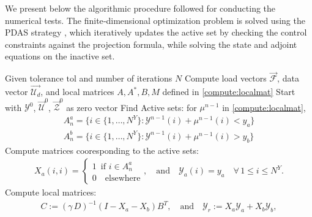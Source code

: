 \documentclass[smallextended]{svjour3}
\numberwithin{equation}{section}
\numberwithin{figure}{section}
\numberwithin{table}{section}
\begin{document}
    \bigskip
    
    \bigskip
    
    \noindent
    We present below the algorithmic procedure followed for conducting the numerical tests. The finite‑dimensional optimization problem is solved using the PDAS strategy \cite{troltzsch10}, which iteratively updates the active set by checking the control constraints against the projection formula, while solving the state and adjoint equations on the inactive set. 
    
    \begin{algorithm*} \label{alg}
	\caption{Implementation} 
    {
	\begin{algorithmic}[1]
    \State Given tolerance $\text{tol}$ and number of iterations $N$
    \State Compute load vectors $\vec{\mathcal{F}}$, data vector $\vec{\mathcal{U}_d}$, and local matrices $A, A^*, B, M$ defined in \eqref{compute:localmat}
            \State Start with $\mathcal{Y}^0$, $\vec{\mathcal{U}}^0$, $\vec{\mathcal{Z}}^0$ as zero vector
            \State Find Active sets: for $\mu^{n-1}$ in \eqref{compute:localmat},
            \begin{align*}
            A_n^a = \{ i \in \{ 1, \dots, N^Y \}: {\mathcal{Y}}^{n-1}(i) + 
            {\mu}^{n-1}(i) < y_a  \} \\
            A_n^b = \{ i \in \{ 1, \dots, N^Y \}: {\mathcal{Y}}^{n-1}(i) + 
            {\mu}^{n-1}(i) > y_b  \}
            \end{align*}
            \State Compute matrices cooresponding to the active sets:
            \begin{align*}
                X_a(i,i)= 
                \begin{cases}
                1 \, \text{ if } i \in A_n^a \\
                0 \quad \text{elsewhere}
                \end{cases}, 
                \quad \text{and} \quad \mathcal{Y}_a(i)=y_a \quad \forall \,1\le i\le N^Y.
            \end{align*}
            \State Compute local matrices:
            \begin{gather*}
            C  := (\gamma \, D)^{-1} (I - X_a - X_b) B^T, \quad  \text{and} \quad
            {\mathcal{Y}}_r :=X_a {\mathcal{Y}}_a +X_b {\mathcal{Y}}_b,

\end{gather*}
\end{algorithmic}}
\end{algorithm*}
\end{document}

